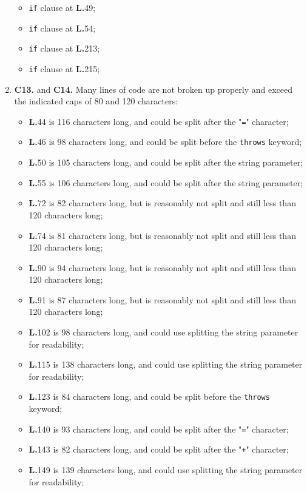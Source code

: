 \begin{enumerate}
	\begin{itemize}
	\item \texttt{if} clause at \textbf{L.}49;
	\item \texttt{if} clause at \textbf{L.}54;
	\item \texttt{if} clause at \textbf{L.}213;
	\item \texttt{if} clause at \textbf{L.}215;
	\end{itemize}
\item \textbf{C13.} and \textbf{C14.} Many lines of code are not broken up properly and exceed the indicated caps of 80 and 120 characters:
	\begin{itemize}
	\item \textbf{L.}44 is 116 characters long, and could be split after the "\texttt{=}" character;
	\item \textbf{L.}46 is 98 characters long, and could be split before the \texttt{throws} keyword;
	\item \textbf{L.}50 is 105 characters long, and could be split after the string parameter;
	\item \textbf{L.}55 is 106 characters long, and could be split after the string parameter;
	\item \textbf{L.}72 is 82 characters long, but is reasonably not split and still less than 120 characters long;
	\item \textbf{L.}74 is 81 characters long, but is reasonably not split and still less than 120 characters long;
	\item \textbf{L.}90 is 94 characters long, but is reasonably not split and still less than 120 characters long;
	\item \textbf{L.}91 is 87 characters long, but is reasonably not split and still less than 120 characters long;
	\item \textbf{L.}102 is 98 characters long, and could use splitting the string parameter for readability;
	\item \textbf{L.}115 is 138 characters long, and could use splitting the string parameter for readability;
	\item \textbf{L.}123 is 84 characters long, and could be split before the \texttt{throws} keyword;
	\item \textbf{L.}140 is 93 characters long, and could be split after the "\texttt{=}" character;
	\item \textbf{L.}143 is 82 characters long, and could be split after the "\texttt{+}" character;
	\item \textbf{L.}149 is 139 characters long, and could use splitting the string parameter for readability;

\end{itemize}
\end{enumerate}
